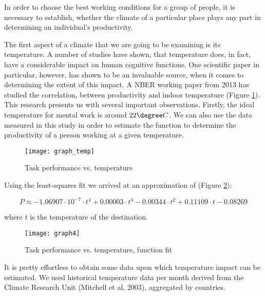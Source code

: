 
In order to choose the best working conditions for a group of people, it is necessary to establish, whether the climate of a particular place plays any part in determining an individual's productivity.

The first aspect of a climate that we are going to be examining is its temperature. A number of studies \cite{Taylor2015,Muller2012} have shown, that temperature does, in fact, have a considerable impact on human cognitive functions. One scientific paper in particular, however, has shown to be an invaluable source, when it comes to determining the extent of this impact. A NBER working paper from 2013 \cite{Chetty2013} has studied the correlation, between productivity and indoor temperature (Figure \ref{temp:research}). This research presents us with several important observations. Firstly, the ideal temperature for mental work is around $22\degree C$. We can also use the data measured in this study in order to estimate the function to determine the productivity of a person working at a given temperature.

\begin{figure}[ht]
    \centering
        \texttt{[image: graph\_temp]}
    \caption{Task performance vs. temperature \cite{Chetty2013}}
    \label{temp:research}
\end{figure}

Using the least-squares fit we arrived at an approximation of (Figure \ref{temp:approximation}):

$$P\approx -1.06907 \cdot 10^{-7} \cdot t^{4}+0.00003 \cdot t^{3}-0.00344 \cdot t^{2}+0.11109 \cdot t-0.08269$$

\noindent where $t$ is the temperature of the destination.

\begin{figure}[ht]
    \centering
        \texttt{[image: graph4]}
    \caption{Task performance vs. temperature, function fit}
    \label{temp:approximation}
\end{figure}

It is pretty effortless to obtain some data upon which temperature impact can be estimated. We used historical temperature data per month derived from the Climate Research Unit (Mitchell et al, 2003), aggregated by countries.

